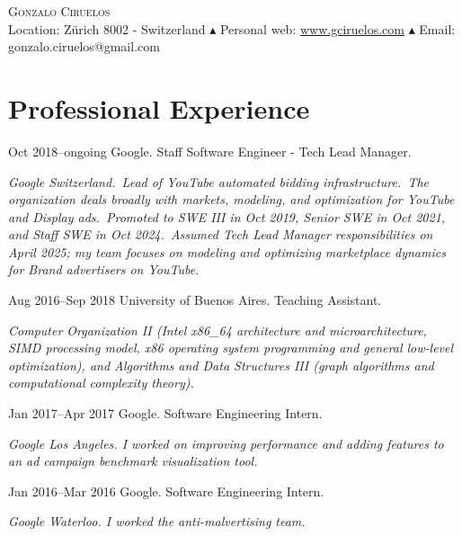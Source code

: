 \documentclass[a4paper,english,10pt]{article}
\begin{document}
\pagestyle{empty}

\begin{center}

  \Large{\textsc{Gonzalo Ciruelos}}\\
  \vspace{0.3em}
\footnotesize{
  Location: Z\"urich 8002 - Switzerland $\blacktriangle$ 
  Personal web: \href{http://www.gciruelos.com}{www.gciruelos.com} $\blacktriangle$
  Email: gonzalo.ciruelos@gmail.com
}
\end{center}


\section{Professional Experience}
\begin{CV}
\item[Oct 2018--ongoing] Google. Staff Software Engineer - Tech Lead Manager.\newline
  \begin{footnotesize}
  \emph{
    Google Switzerland.\
    Lead of YouTube automated bidding infrastructure.\
    The organization deals broadly with markets, modeling, and optimization for YouTube and Display ads.\
    Promoted to SWE III in Oct 2019, Senior SWE in Oct 2021, and Staff SWE in Oct 2024.\
    Assumed Tech Lead Manager responsibilities on April 2025; my team focuses on modeling and optimizing marketplace dynamics for Brand advertisers on YouTube.
  }
  \end{footnotesize}
\item[Aug 2016--Sep 2018] University of Buenos Aires. Teaching Assistant.\newline
  \begin{footnotesize}
  \emph{Computer Organization II (Intel x86\_64 architecture and microarchitecture, SIMD processing model, x86 operating system programming and general low-level optimization), and Algorithms and Data Structures III (graph algorithms and computational complexity theory).}
  \end{footnotesize}
\item[Jan 2017--Apr 2017] Google. Software Engineering Intern.\newline
  \begin{footnotesize}
  \emph{Google Los Angeles. I worked on improving performance and adding features to an ad campaign benchmark visualization tool.}
  \end{footnotesize}
\item[Jan 2016--Mar 2016] Google. Software Engineering Intern.\newline
  \begin{footnotesize}
  \emph{Google Waterloo. I worked the anti-malvertising team.}
  \end{footnotesize}
\end{CV}
\end{document}
